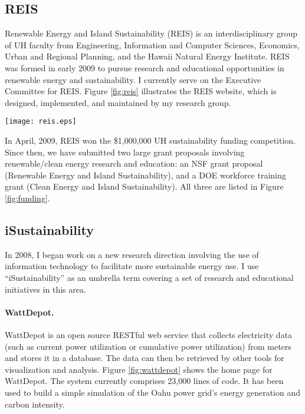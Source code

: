 \documentclass[11pt]{article}
\begin{document}
\subsection{REIS}

Renewable Energy and Island Sustainability (REIS) is an interdisciplinary
group of UH faculty from Engineering, Information and Computer Sciences,
Economics, Urban and Regional Planning, and the Hawaii Natural Energy
Institute.  REIS was formed in early 2009 to pursue research and
educational opportunities in renewable energy and sustainability.  I
currently serve on the Executive Committee for REIS.  Figure
\ref{fig:reis} illustrates the REIS website, which is designed,
implemented, and maintained by my research group.

\begin{figure*}[ht]
  \center
  \texttt{[image: reis.eps]}
  \caption{The REIS Home Page}
  \label{fig:reis}
\end{figure*}  

In April, 2009, REIS won the \$1,000,000 UH sustainability funding
competition.  Since then, we have submitted two large grant proposals
involving renewable/clean energy research and education: an NSF grant
proposal (Renewable Energy and Island Sustainability), and a DOE workforce
training grant (Clean Energy and Island Sustainability).  All three are
listed in Figure \ref{fig:funding}.

\subsection{iSustainability}

In 2008, I began work on a new research direction involving the use of
information technology to facilitate more sustainable energy use.  I use
``iSustainability'' as an umbrella term covering a set of research and
educational initiatives in this area.  

\paragraph{WattDepot.}  WattDepot is an open source RESTful web service
that collects electricity data (such as current power utilization or
cumulative power utilization) from meters and stores it in a database. The
data can then be retrieved by other tools for visualization and analysis.
Figure \ref{fig:wattdepot} shows the home page for WattDepot.  The system
currently comprises 23,000 lines of code.  It has been used to build a
simple simulation of the Oahu power grid's energy generation and carbon
intensity.  
\end{document}

